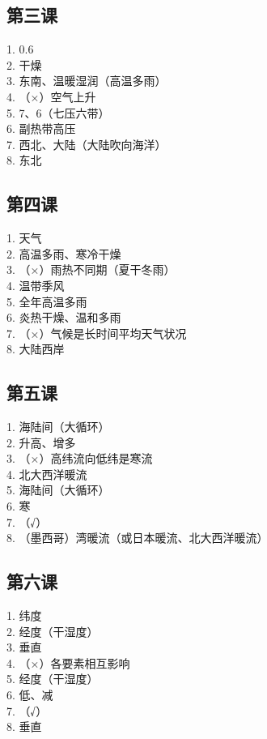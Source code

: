 \documentclass[a4paper,12pt]{ctexart}
\begin{document}
\subsection*{第三课}
1. 0.6\\
2. 干燥\\
3. 东南、温暖湿润（高温多雨）\\
4. （×）空气上升\\
5. 7、6（七压六带）\\
6. 副热带高压\\
7. 西北、大陆（大陆吹向海洋）\\
8. 东北

\subsection*{第四课}
1. 天气\\
2. 高温多雨、寒冷干燥\\
3. （×）雨热不同期（夏干冬雨）\\
4. 温带季风\\
5. 全年高温多雨\\
6. 炎热干燥、温和多雨\\
7. （×）气候是长时间平均天气状况\\
8. 大陆西岸

\subsection*{第五课}
1. 海陆间（大循环）\\
2. 升高、增多\\
3. （×）高纬流向低纬是寒流\\
4. 北大西洋暖流\\
5. 海陆间（大循环）\\
6. 寒\\
7. （√）\\
8. （墨西哥）湾暖流（或日本暖流、北大西洋暖流）

\subsection*{第六课}
1. 纬度\\
2. 经度（干湿度）\\
3. 垂直\\
4. （×）各要素相互影响\\
5. 经度（干湿度）\\
6. 低、减\\
7. （√）\\
8. 垂直
\end{document}
